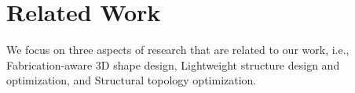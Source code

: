 \section{Related Work }
\label{sec:related}





We focus on three aspects of research that are related to our work, i.e., Fabrication-aware 3D shape design, Lightweight structure design and optimization, and Structural topology optimization.

